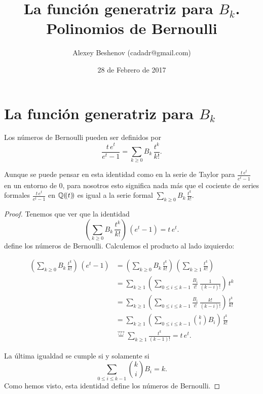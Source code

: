 \documentclass{article}
\author{Alexey Beshenov (cadadr@gmail.com)}
\title{La función generatriz para $B_k$. Polinomios de Bernoulli}
\date{28 de Febrero de 2017}
\begin{document}
{\normalfont\sffamily\bfseries \maketitle}

\section*{La función generatriz para $B_k$}

\begin{teorema*}
Los números de Bernoulli pueden ser definidos por
$$\frac{t\,e^t}{e^t - 1} = \sum_{k \ge 0} B_k \, \frac{t^k}{k!}.$$
\end{teorema*}

Aunque se puede pensar en esta identidad como en la serie de Taylor para $\frac{t\,e^t}{e^t - 1}$ en un entorno de $0$, para nosotros esto significa nada más que el cociente de series formales $\frac{t\,e^t}{e^t - 1}$ en $\mathbb{Q} (\!(t)\!)$ es igual a la serie formal $\sum_{k \ge 0} B_k \, \frac{t^k}{k!}$.

\begin{proof}
Tenemos que ver que la identidad
$$\left(\sum_{k \ge 0} B_k \, \frac{t^k}{k!}\right)\,(e^t-1) = t\,e^t.$$
define los números de Bernoulli. Calculemos el producto al lado izquierdo:

\begin{align*}
\left(\sum_{k \ge 0} B_k \, \frac{t^k}{k!}\right)\,(e^t-1) & = 
\left(\sum_{k \ge 0} B_k \, \frac{t^k}{k!}\right)\,\left(\sum_{k\ge 1} \frac{t^k}{k!}\right) \\
 & = \sum_{k \ge 1} \left(\sum_{0 \le i \le k-1} \frac{B_i}{i!}\,\frac{1}{(k-i)!}\right)\,t^k \\
 & = \sum_{k \ge 1} \left(\sum_{0 \le i \le k-1} \frac{B_i}{i!}\,\frac{k!}{(k-i)!}\right)\,\frac{t^k}{k!} \\
 & = \sum_{k \ge 1} \left(\sum_{0 \le i \le k-1} {k \choose i} B_i\right)\,\frac{t^k}{k!} \\
 & \stackrel{???}{=} \sum_{k\ge 1} \frac{t^k}{(k-1)!} = t\,e^t.
\end{align*}

La última igualdad se cumple si y solamente si
$$\sum_{0 \le i \le k-1} {k \choose i} B_i = k.$$
Como hemos visto, esta identidad define los números de Bernoulli.
\end{proof}
\end{document}
